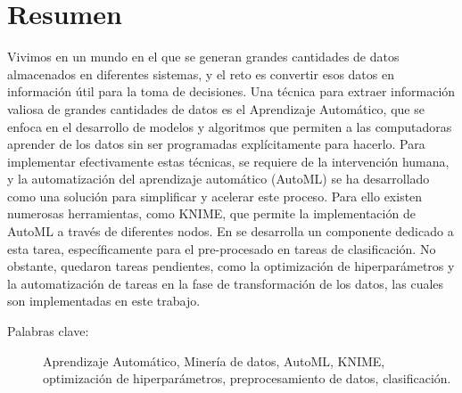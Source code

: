 \section*{Resumen}
Vivimos en un mundo en el que se generan grandes cantidades de datos almacenados en diferentes sistemas, y el reto es convertir esos datos en información útil para la toma de decisiones. Una técnica para extraer información valiosa de grandes cantidades de datos es el Aprendizaje Automático, que se enfoca en el desarrollo de modelos y algoritmos que permiten a las computadoras aprender de los datos sin ser programadas explícitamente para hacerlo. Para implementar efectivamente estas técnicas, se requiere de la intervención humana, y la automatización del aprendizaje automático (AutoML) se ha desarrollado como una solución para simplificar y acelerar este proceso. Para ello existen numerosas herramientas, como KNIME, que permite la implementación de AutoML a través de diferentes nodos. En \citep{Carrazana2022} se desarrolla un componente dedicado a esta tarea, específicamente para el pre-procesado en tareas de clasificación. No obstante, quedaron tareas pendientes, como la optimización de hiperparámetros y la automatización de tareas en la fase de transformación de los datos, las cuales son implementadas en este trabajo. 



\begin{description}
	\item[Palabras clave:]{Aprendizaje Automático, Minería de datos, AutoML, KNIME, optimización de hiperparámetros, preprocesamiento de datos, clasificación.}
\end{description}


